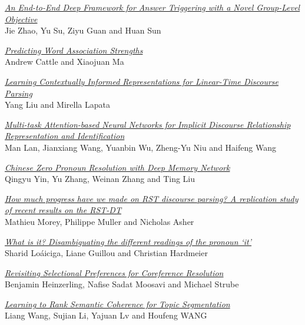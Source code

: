 \hyperlink{page.1285}{\em An End-to-End Deep Framework for Answer Triggering with a Novel Group-Level Objective}\samepage \\
\hspace*{7mm} Jie Zhao, Yu Su, Ziyu Guan and Huan Sun\dotfill {}

\hyperlink{page.1292}{\em Predicting Word Association Strengths}\samepage \\
\hspace*{7mm} Andrew Cattle and Xiaojuan Ma\dotfill {}

\hyperlink{page.1298}{\em Learning Contextually Informed Representations for Linear-Time Discourse Parsing}\samepage \\
\hspace*{7mm} Yang Liu and Mirella Lapata\dotfill {}

\hyperlink{page.1308}{\em Multi-task Attention-based Neural Networks for Implicit Discourse Relationship Representation and Identification}\samepage \\
\hspace*{7mm} Man Lan, Jianxiang Wang, Yuanbin Wu, Zheng-Yu Niu and Haifeng Wang\dotfill {}

\hyperlink{page.1318}{\em Chinese Zero Pronoun Resolution with Deep Memory Network}\samepage \\
\hspace*{7mm} Qingyu Yin, Yu Zhang, Weinan Zhang and Ting Liu\dotfill {}

\hyperlink{page.1328}{\em How much progress have we made on RST discourse parsing? A replication study of recent results on the RST-DT}\samepage \\
\hspace*{7mm} Mathieu Morey, Philippe Muller and Nicholas Asher\dotfill {}

\hyperlink{page.1334}{\em What is it? Disambiguating the different readings of the pronoun ‘it’}\samepage \\
\hspace*{7mm} Sharid Lo\'{a}iciga, Liane Guillou and Christian Hardmeier\dotfill {}

\hyperlink{page.1341}{\em Revisiting Selectional Preferences for Coreference Resolution}\samepage \\
\hspace*{7mm} Benjamin Heinzerling, Nafise Sadat Moosavi and Michael Strube\dotfill {}

\hyperlink{page.1349}{\em Learning to Rank Semantic Coherence for Topic Segmentation}\samepage \\
\hspace*{7mm} Liang Wang, Sujian Li, Yajuan Lv and Houfeng WANG\dotfill {}

